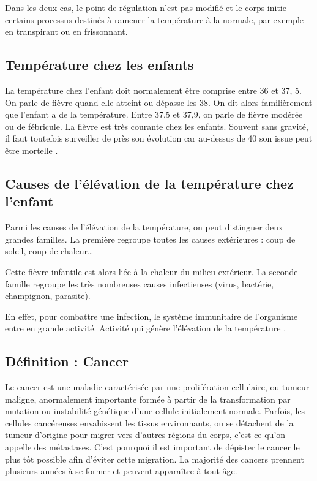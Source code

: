 \documentclass[12pt]{article}
\begin{document}
Dans les deux cas, le point de régulation n'est pas modifié et le corps initie certains processus destinés à ramener la température à la normale, par exemple en transpirant ou en frissonnant.

\subsection{Température chez les enfants}
La température chez l’enfant doit normalement être comprise entre 36 et 37, 5. On parle de fièvre quand elle atteint ou dépasse les 38. On dit alors familièrement que l’enfant a de la température. Entre 37,5 et 37,9, on parle de fièvre modérée ou de fébricule. La fièvre est très courante chez les enfants. Souvent sans gravité, il faut toutefois surveiller de près son évolution car au-dessus de 40 son issue peut être mortelle \cite{29}.

\subsection{Causes de l'élévation de la température chez l’enfant}
Parmi les causes de l'élévation de la température, on peut distinguer deux grandes familles. La première regroupe toutes les causes extérieures : coup de soleil, coup de chaleur… 

Cette fièvre infantile est alors liée à la chaleur du milieu extérieur. La seconde famille regroupe les très nombreuses causes infectieuses (virus, bactérie, champignon, parasite).

En effet, pour combattre une infection, le système immunitaire de l’organisme entre en grande activité. Activité qui génère l’élévation de la température \cite{30}.

\subsection{Définition : Cancer}
Le cancer est une maladie caractérisée par une prolifération cellulaire, ou tumeur maligne, anormalement importante formée à partir de la transformation par mutation ou instabilité génétique d'une cellule initialement normale. Parfois, les cellules cancéreuses envahissent les tissus environnants, ou se détachent de la tumeur d'origine pour migrer vers d'autres régions du corps, c'est ce qu'on appelle des métastases. C'est pourquoi il est important de dépister le cancer le plus tôt possible afin d'éviter cette migration. La majorité des cancers prennent plusieurs années à se former et peuvent apparaître à tout âge. 
\end{document}
